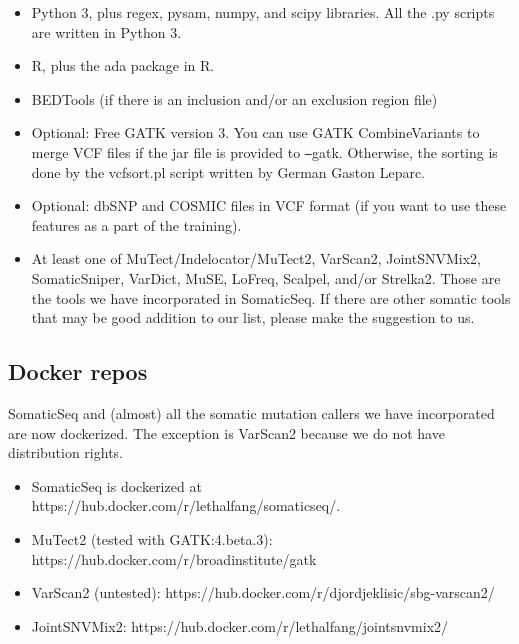 \documentclass[10pt,letterpaper]{article}
\begin{document}
\begin{sloppypar}
\begin{itemize}
\item
Python 3, plus regex, pysam, numpy, and scipy libraries. All the .py scripts are written in Python 3.

\item
R, plus the ada package in R.

\item
BEDTools (if there is an inclusion and/or an exclusion region file)

\item
Optional: Free GATK version 3. You can use GATK CombineVariants to merge VCF files if the jar file is provided to \texttt{--}gatk. Otherwise, the sorting is done by the vcfsort.pl script written by German Gaston Leparc. 

\item
Optional: dbSNP and COSMIC files in VCF format (if you want to use these features as a part of the training).

\item
At least one of MuTect/Indelocator/MuTect2, VarScan2, JointSNVMix2, SomaticSniper, VarDict, MuSE, LoFreq, Scalpel, and/or Strelka2. Those are the tools we have incorporated in SomaticSeq. If there are other somatic tools that may be good addition to our list, please make the suggestion to us. 

\end{itemize}


\subsection{Docker repos}

SomaticSeq and (almost) all the somatic mutation callers we have incorporated are now dockerized. The exception is VarScan2 because we do not have distribution rights. 

\begin{itemize}

  \item SomaticSeq is dockerized at https://hub.docker.com/r/lethalfang/somaticseq/.
  
  \item MuTect2 (tested with GATK:4.beta.3): https://hub.docker.com/r/broadinstitute/gatk

  \item VarScan2 (untested): https://hub.docker.com/r/djordjeklisic/sbg-varscan2/

  \item JointSNVMix2: https://hub.docker.com/r/lethalfang/jointsnvmix2/


\end{itemize}
\end{sloppypar}
\end{document}
